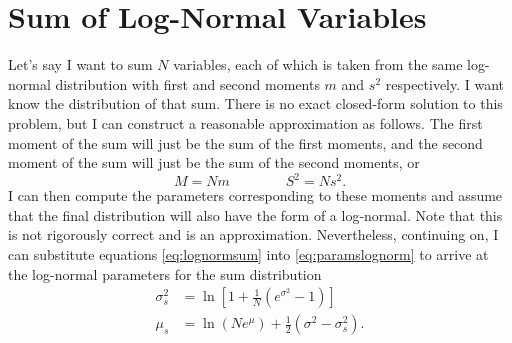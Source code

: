 \documentclass[../../main.tex]{subfiles}
\begin{document}
\section{Sum of Log-Normal Variables}
Let's say I want to sum $N$ variables, each of which is taken from the same
log-normal distribution  with first and second moments $m$ and $s^2$
respectively.  I want know the distribution of that sum.  There
is no exact closed-form solution to this problem, but I can construct a
reasonable approximation as follows.  The first moment of the sum will just be
the sum of the first moments, and the second moment of the sum will just be
the sum of the second moments, or
\begin{equation}
    \label{eq:lognormsum}
    M = N m
    \qquad\qquad
    S^2 = N s^2.
\end{equation}
I can then compute the parameters corresponding to these moments and assume
that the final distribution will also have the form of a log-normal.  Note
that this is not rigorously correct and is an approximation.  Nevertheless,
continuing on, I can substitute equations \eqref{eq:lognormsum} into
\eqref{eq:paramslognorm} to arrive at the log-normal parameters for the sum
distribution
\begin{align}
    \sigma_s^2 &=
    \ln{\left[
    1 + \frac{1}{N} \left( e^{\sigma^2} - 1 \right) \right]} \nonumber\\
    \mu_s &= \ln{\left( N e^\mu \right)} + \frac{1}{2}
             \left(\sigma^2 - \sigma_s^2 \right).
\end{align}
\end{document}

